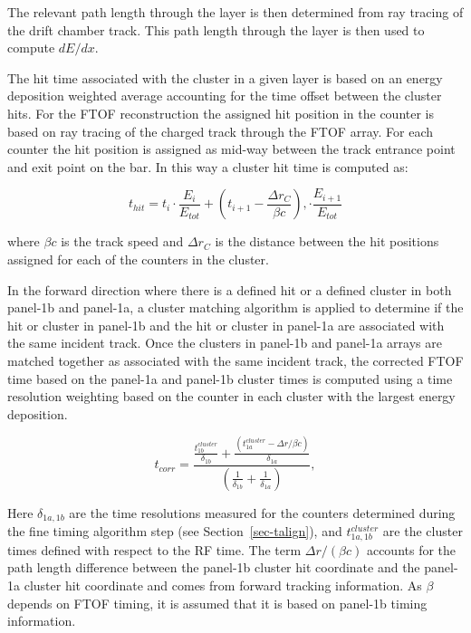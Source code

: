 \documentclass{elsart}
\begin{document}
\noindent
The relevant path length through the layer is then determined from ray tracing of the drift chamber track.
This path length through the layer is then used to compute $dE/dx$.

The hit time associated with the cluster in a given layer is based on an energy deposition weighted average
accounting for the time offset between the cluster hits. For the FTOF reconstruction the assigned hit
position in the counter is based on ray tracing of the charged track through the FTOF array. For each counter
the hit position is assigned as mid-way between the track entrance point and exit point on the bar. In this way
a cluster hit time is computed as:

\begin{equation}
t_{hit} = t_i \cdot \frac{E_i}{E_{tot}} + \left(t_{i+1} - \frac{\Delta r_C}{\beta c} \right),
\cdot \frac{E_{i+1}}{E_{tot}}
\end{equation}

\noindent
where $\beta c$ is the track speed and $\Delta r_C$ is the distance between the hit positions assigned for each
of the counters in the cluster.

In the forward direction where there is a defined hit or a defined cluster in both panel-1b and panel-1a, a cluster
matching algorithm is applied to determine if the hit or cluster in panel-1b and the hit or cluster in panel-1a are
associated with the same incident track. Once the clusters in panel-1b and panel-1a arrays are matched together
as associated with the same incident track, the corrected FTOF time based on the panel-1a and panel-1b cluster
times is computed using a time resolution weighting based on the counter in each cluster with the largest 
energy deposition.

\begin{equation}
  t_{corr} = \frac{\displaystyle \frac{\displaystyle t_{1b}^{cluster}}{\displaystyle \delta_{1b}} +
    \frac{\displaystyle (t_{1a}^{cluster} - \Delta r/\beta c)}{\displaystyle \delta_{1a}}}
  {\displaystyle \left( \frac{\displaystyle 1}{\displaystyle \delta_{1b}} +
    \frac{\displaystyle 1}{\displaystyle \delta_{1a}} \right)},
\end{equation}

\noindent
Here $\delta_{1a,1b}$ are the time resolutions measured for the counters determined during the fine timing
algorithm step (see Section~\ref{sec-talign}), and $t_{1a,1b}^{cluster}$ are the cluster times defined with
respect to the RF time. The term $\Delta r/(\beta c)$ accounts for the path length difference between
the panel-1b cluster hit coordinate and the panel-1a cluster hit coordinate and comes from forward tracking
information. As $\beta$ depends on FTOF timing, it is assumed that it is based on panel-1b timing information.
\end{document}
